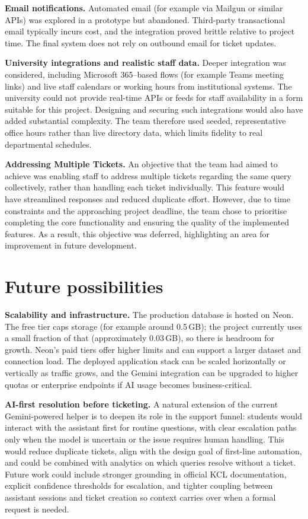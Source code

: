 \textbf{Email notifications.} Automated email (for example via Mailgun or similar APIs) was explored in a prototype but abandoned. Third-party transactional email typically incurs cost, and the integration proved brittle relative to project time. The final system does not rely on outbound email for ticket updates.

\textbf{University integrations and realistic staff data.} Deeper integration was considered, including Microsoft 365--based flows (for example Teams meeting links) and live staff calendars or working hours from institutional systems. The university could not provide real-time APIs or feeds for staff availability in a form suitable for this project. Designing and securing such integrations would also have added substantial complexity. The team therefore used seeded, representative office hours rather than live directory data, which limits fidelity to real departmental schedules.

\textbf{Addressing Multiple Tickets.} An objective that the team had aimed to achieve was enabling staff to address multiple tickets regarding the same query collectively, rather than handling each ticket individually. This feature would have streamlined responses and reduced duplicate effort. However, due to time constraints and the approaching project deadline, the team chose to prioritise completing the core functionality and ensuring the quality of the implemented features. As a result, this objective was deferred, highlighting an area for improvement in future development.

\section{Future possibilities}

\textbf{Scalability and infrastructure.} The production database is hosted on Neon. The free tier caps storage (for example around 0.5\,GB); the project currently uses a small fraction of that (approximately 0.03\,GB), so there is headroom for growth. Neon’s paid tiers offer higher limits and can support a larger dataset and connection load. The deployed application stack can be scaled horizontally or vertically as traffic grows, and the Gemini integration can be upgraded to higher quotas or enterprise endpoints if AI usage becomes business-critical.

\textbf{AI-first resolution before ticketing.} A natural extension of the current Gemini-powered helper is to deepen its role in the support funnel: students would interact with the assistant first for routine questions, with clear escalation paths only when the model is uncertain or the issue requires human handling. This would reduce duplicate tickets, align with the design goal of first-line automation, and could be combined with analytics on which queries resolve without a ticket. Future work could include stronger grounding in official KCL documentation, explicit confidence thresholds for escalation, and tighter coupling between assistant sessions and ticket creation so context carries over when a formal request is needed.
